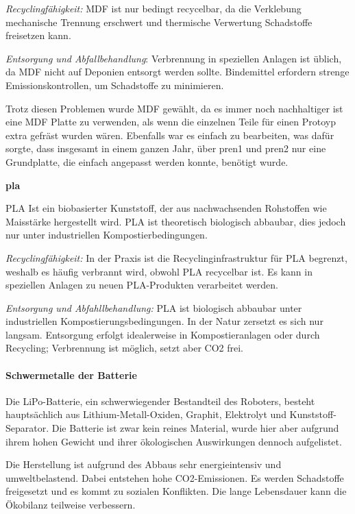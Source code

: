 \textit{Recyclingfähigkeit:}  MDF ist nur bedingt recycelbar, da die Verklebung mechanische Trennung erschwert und thermische Verwertung Schadstoffe freisetzen kann.\cite{support-2024}

\textit{Entsorgung und Abfallbehandlung}: Verbrennung in speziellen Anlagen ist üblich, da MDF
nicht auf Deponien entsorgt werden sollte. Bindemittel erfordern strenge Emissionskontrollen, um Schadstoffe zu minimieren.\cite{mdf-entsorgung}

Trotz diesen Problemen wurde MDF gewählt, da es immer noch nachhaltiger ist eine MDF Platte zu verwenden, als wenn die einzelnen Teile für einen Protoyp extra gefräst wurden wären. Ebenfalls war es einfach zu bearbeiten, was dafür sorgte, dass insgesamt in einem ganzen Jahr, über \acrshort{pren1} und \acrshort{pren2} nur eine Grundplatte, die einfach angepasst werden konnte, benötigt wurde.
 
\textbf{\acrfull{pla}}

PLA Ist ein biobasierter Kunststoff, der aus nachwachsenden Rohstoffen wie Maisstärke hergestellt wird. PLA ist theoretisch biologisch abbaubar, dies jedoch nur unter industriellen Kompostierbedingungen.

\textit{Recyclingfähigkeit:} In der Praxis ist die Recyclinginfrastruktur für PLA begrenzt, weshalb es häufig verbrannt wird, obwohl PLA recycelbar ist.
Es kann in speziellen Anlagen zu neuen PLA-Produkten verarbeitet werden. \cite{pla-recycling}

\textit{Entsorgung und Abfahllbehandlung:} PLA ist biologisch abbaubar unter industriellen Kompostierungsbedingungen. In der Natur zersetzt es sich nur langsam. Entsorgung erfolgt
idealerweise in Kompostieranlagen oder durch Recycling; Verbrennung ist möglich, setzt
aber CO2 frei.\cite{pla-details}


\paragraph{Schwermetalle der Batterie}

Die LiPo-Batterie, ein schwerwiegender Bestandteil des Roboters, besteht hauptsächlich aus Lithium-Metall-Oxiden, Graphit, Elektrolyt und Kunststoff-Separator. Die Batterie ist zwar kein reines Material, wurde hier aber aufgrund ihrem hohen Gewicht und ihrer ökologischen Auswirkungen dennoch aufgelistet.\cite{litio-akkus}

Die Herstellung ist aufgrund des Abbaus sehr energieintensiv und umweltbelastend. Dabei entstehen hohe CO2-Emissionen. Es werden Schadstoffe freigesetzt und es kommt zu sozialen Konflikten. Die lange Lebensdauer kann die Ökobilanz teilweise verbessern.\cite{tezgoren}

